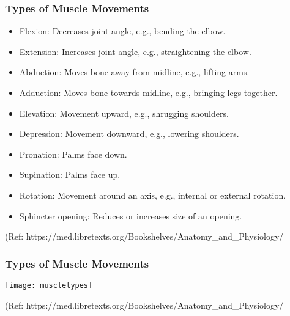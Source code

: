 \begin{frame}[fragile]\frametitle{Types of Muscle Movements}

      \begin{itemize}
		\item Flexion: Decreases joint angle, e.g., bending the elbow.
		\item Extension: Increases joint angle, e.g., straightening the elbow.
		\item Abduction: Moves bone away from midline, e.g., lifting arms.
		\item Adduction: Moves bone towards midline, e.g., bringing legs together.
		\item Elevation: Movement upward, e.g., shrugging shoulders.
		\item Depression: Movement downward, e.g., lowering shoulders.
		\item Pronation: Palms face down.
		\item Supination: Palms face up.
		\item Rotation: Movement around an axis, e.g., internal or external rotation.
		\item Sphincter opening: Reduces or increases size of an opening.
	  \end{itemize}

  
		{\tiny (Ref: https://med.libretexts.org/Bookshelves/Anatomy\_and\_Physiology/}		
  
\end{frame}

\begin{frame}[fragile]\frametitle{Types of Muscle Movements}

		\begin{center}
		\texttt{[image: muscletypes]}
				
		\end{center}	

  
		{\tiny (Ref: https://med.libretexts.org/Bookshelves/Anatomy\_and\_Physiology/}		
  
\end{frame}

